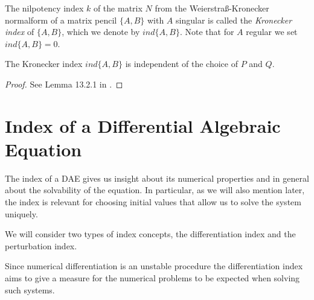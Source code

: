 \begin{definition}
	The nilpotency index $k$ of the matrix $N$ from the Weierstraß-Kronecker normalform of a matrix pencil $\{A,B\}$ with $A$ singular is called the \emph{Kronecker index} of $\{A,B\}$, which we denote by $ind\{A,B\}$. Note that for $A$ regular we set $ind\{A,B\} = 0$.
\end{definition}


\begin{lemma}
	\label{Lemma:indipendence of Kronecker index}
	The Kronecker index $ind\{A,B\}$ is independent of the choice of $P$ and $Q$.
\end{lemma}

\begin{proof}
	See Lemma 13.2.1 in .
\end{proof}





\section{Index of a Differential Algebraic Equation}

The index of a DAE gives us insight about its numerical properties and in general about the solvability of the equation. In particular, as we will also mention later, the index is relevant for choosing initial values that allow us to solve the system uniquely.

We will consider two types of index concepts, the differentiation index and the perturbation index.

Since numerical differentiation is an unstable procedure the differentiation index aims to give a measure for the numerical problems to be expected when solving such systems.

\newpage

